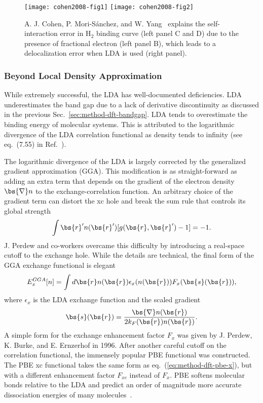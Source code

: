 \begin{figure}[h]
\texttt{[image: cohen2008-fig1]}
\texttt{[image: cohen2008-fig2]}
\caption{A. J. Cohen, P. Mori-S\'anchez, and W. Yang~\cite{Cohen2008} explains the self-interaction error in H$_2$ binding curve (left panel C and D) due to the presence of fractional electron (left panel B), which leads to a delocalization error when LDA is used (right panel).}
\label{fig:method-dft-smooth-lda}
\end{figure}


\subsubsection{Beyond Local Density Approximation}

While extremely successful, the LDA has well-documented deficiencies. LDA underestimates the band gap due to a lack of derivative discontinuity as discussed in the previous Sec.~\ref{sec:method-dft-bandgap}. LDA tends to overestimate the binding energy of molecular systems. This is attributed to the logarithmic divergence of the LDA correlation functional as density tends to infinity (see eq.~(7.55) in Ref.~\cite{Giuliani2005}).

The logarithmic divergence of the LDA is largely corrected by the generalized gradient approximation (GGA). This modification is as straight-forward as adding an extra term that depends on the gradient of the electron density $\bs{\nabla}n$ to the exchange-correlation function. An arbitrary choice of the gradient term can distort the xc hole and break the sum rule that controls its global strength
\begin{align}
\int\bs{r}' n(\bs{r}')[g(\bs{r},\bs{r}')-1] = -1.
\end{align}
J. Perdew and co-workers overcame this difficulty by introducing a real-space cutoff to the exchange hole. While the details are technical, the final form of the GGA exchange functional is elegant
\begin{align} \label{eq:method-dft-pbe-x}
E_x^{GGA}[n] = \int d\bs{r} n(\bs{r})\epsilon_x(n(\bs{r}))F_x(\bs{s}(\bs{r})),
\end{align}
where $\epsilon_x$ is the LDA exchange function and the scaled gradient
\begin{align}
\bs{s}(\bs{r}) = \dfrac{\bs{\nabla}n(\bs{r})}{2k_F(\bs{r})n(\bs{r})}.
\end{align}
A simple form for the exchange enhancement factor $F_x$ was given by J. Perdew, K. Burke, and E. Ernzerhof in 1996. After another careful cutoff on the correlation functional, the immensely popular PBE functional was constructed. The PBE xc functional takes the same form as eq.~(\ref{eq:method-dft-pbe-x}), but with a different enhancement factor $F_{xc}$ instead of $F_x$.
PBE softens molecular bonds relative to the LDA and predict an order of magnitude more accurate dissociation energies of many molecules~\cite{Perdew1996}.

